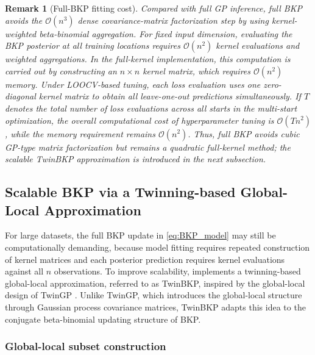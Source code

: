 \documentclass[article, shortnames]{jss}
\newtheorem{remark}{Remark}
\begin{document}
\begin{remark}[Full-BKP fitting cost]
	Compared with full GP inference, full BKP avoids the $\mathcal{O}(n^3)$ dense covariance-matrix factorization step by using kernel-weighted beta-binomial aggregation. 
	For fixed input dimension, evaluating the BKP posterior at all training locations requires $\mathcal{O}(n^2)$ kernel evaluations and weighted aggregations. 
	In the full-kernel implementation, this computation is carried out by constructing an $n\times n$ kernel matrix, which requires $\mathcal{O}(n^2)$ memory. 
	Under LOOCV-based tuning, each loss evaluation uses one zero-diagonal kernel matrix to obtain all leave-one-out predictions simultaneously. 
	If $T$ denotes the total number of loss evaluations across all starts in the multi-start optimization, the overall computational cost of hyperparameter tuning is $\mathcal{O}(Tn^2)$, while the memory requirement remains $\mathcal{O}(n^2)$. 
	Thus, full BKP avoids cubic GP-type matrix factorization but remains a quadratic full-kernel method; the scalable TwinBKP approximation is introduced in the next subsection.
\end{remark}

\subsection{Scalable BKP via a Twinning-based Global-Local Approximation}\label{sec:TwinBKP}

For large datasets, the full BKP update in \eqref{eq:BKP_model} may still be computationally demanding, because model fitting requires repeated construction of kernel matrices and each posterior prediction requires kernel evaluations against all $n$ observations.
To improve scalability,  implements a twinning-based global-local approximation, referred to as TwinBKP, inspired by the global-local design of TwinGP \citep{Vakayil2024TwinGP}. 
Unlike TwinGP, which introduces the global-local structure through Gaussian process covariance matrices, TwinBKP adapts this idea to the conjugate beta-binomial updating structure of BKP.

\subsubsection{Global-local subset construction}
\end{document}
